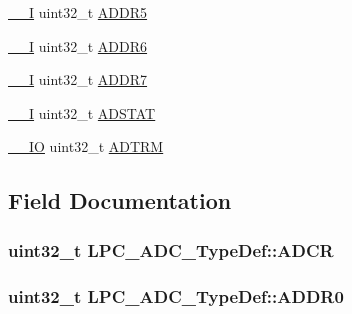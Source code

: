 \begin{DoxyCompactItemize}
\item 
\hyperlink{LPC17xx_8h_af63697ed9952cc71e1225efe205f6cd3}{\+\_\+\+\_\+I} uint32\+\_\+t \hyperlink{structLPC__ADC__TypeDef_ac698d7e4437bf3230071dc3d8274f4bd}{A\+D\+D\+R5}
\item 
\hyperlink{LPC17xx_8h_af63697ed9952cc71e1225efe205f6cd3}{\+\_\+\+\_\+I} uint32\+\_\+t \hyperlink{structLPC__ADC__TypeDef_a607f501dbfce5b3fd777a7a4a480a353}{A\+D\+D\+R6}
\item 
\hyperlink{LPC17xx_8h_af63697ed9952cc71e1225efe205f6cd3}{\+\_\+\+\_\+I} uint32\+\_\+t \hyperlink{structLPC__ADC__TypeDef_a40afea4e61d223f707998d5f22dbfc7c}{A\+D\+D\+R7}
\item 
\hyperlink{LPC17xx_8h_af63697ed9952cc71e1225efe205f6cd3}{\+\_\+\+\_\+I} uint32\+\_\+t \hyperlink{structLPC__ADC__TypeDef_a731ad153d3d54d3ba2677eecb30c3097}{A\+D\+S\+T\+AT}
\item 
\hyperlink{LPC17xx_8h_aec43007d9998a0a0e01faede4133d6be}{\+\_\+\+\_\+\+IO} uint32\+\_\+t \hyperlink{structLPC__ADC__TypeDef_aa66f6667bdd2b2110f2e25e7c8da94a9}{A\+D\+T\+RM}
\end{DoxyCompactItemize}


\subsection{Field Documentation}
\subsubsection[{\texorpdfstring{A\+D\+CR}{ADCR}}]{ uint32\+\_\+t L\+P\+C\+\_\+\+A\+D\+C\+\_\+\+Type\+Def\+::\+A\+D\+CR}\hypertarget{structLPC__ADC__TypeDef_ab0949d845f781071595de5c830fab8a7}{}\label{structLPC__ADC__TypeDef_ab0949d845f781071595de5c830fab8a7}
\subsubsection[{\texorpdfstring{A\+D\+D\+R0}{ADDR0}}]{ uint32\+\_\+t L\+P\+C\+\_\+\+A\+D\+C\+\_\+\+Type\+Def\+::\+A\+D\+D\+R0}\hypertarget{structLPC__ADC__TypeDef_a3168f35782efa83907f5a1001b5a53e7}{}\label{structLPC__ADC__TypeDef_a3168f35782efa83907f5a1001b5a53e7}
